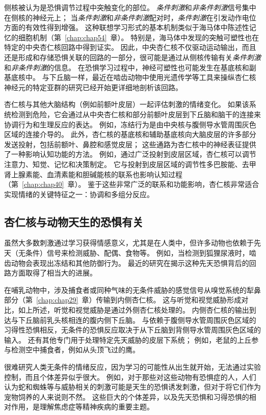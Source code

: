 侧核被认为是恐惧调节过程中突触变化的部位。
\textit{条件刺激}和\textit{非条件刺激}信号集中在侧核的神经元上；
当\textit{条件刺激}和\textit{非条件刺激}配对时，\textit{条件刺激}在引发动作电位方面的有效性得到增强。
这种联想学习形式的基本机制类似于海马体中陈述性记忆的细胞机制（第~\ref{chap:chap54}~章）。
特别是，海马体中发现的突触可塑性也在特定的中央杏仁核回路中得到证实。
因此，中央杏仁核不仅驱动运动输出，而且还是形成和存储恐惧关联的回路的一部分，很可能是通过从侧核传输有关\textit{条件刺激}和\textit{非条件刺激}的信息。
在恐惧学习过程中，神经可塑性也可能发生在基底核和副基底核中。
与下丘脑一样，最近在啮齿动物中使用光遗传学等工具来操纵杏仁核神经元的特定亚群的研究已经开始更详细地剖析该回路。


杏仁核与其他大脑结构（例如前额叶皮层）一起评估刺激的情绪变化。
如果该系统检测到危险，它会通过从中央杏仁核和部分前额叶皮层到下丘脑和脑干的连接来协调行为和生理反应的表达。
例如，冻结行为是由中央核与腹侧导水管周围灰色区域的连接介导的。
此外，杏仁核的基底核和辅助基底核向大脑皮层的许多部分发送投射，包括前额叶、鼻腔和感觉皮层；
这些通路为杏仁核中的神经表征提供了一种影响认知功能的方法。
例如，通过广泛投射到皮层区域，杏仁核可以调节注意力、知觉、记忆和决策制定。
它与投射到皮层区域的调节性多巴胺能、去甲肾上腺素能、血清素能和胆碱能核的联系也影响认知过程（第~\ref{chap:chap40}~章）。
鉴于这些非常广泛的联系和功能影响，杏仁核非常适合实现情绪的关键特征之一：协调和多组分反应。



\subsection{杏仁核与动物天生的恐惧有关}

虽然大多数刺激通过学习获得情感意义，尤其是在人类中，但许多动物也依赖于先天（无条件）信号来检测威胁、配偶、食物等。
例如，当检测到狐狸尿液时，啮齿动物会表现出冻结和其他防御行为。
最近的研究在揭示这种先天恐惧背后的回路方面取得了相当大的进展。


在哺乳动物中，涉及捕食者或同种气味的无条件威胁的感觉信号从嗅觉系统的犁鼻部分（第~\ref{chap:chap29}~章）传输到内侧杏仁核。
这与听觉和视觉威胁形成对比，如上所述，听觉和视觉威胁是通过外侧杏仁核处理的。
内侧杏仁核的输出到达与下丘脑前乳头核相连的腹内侧下丘脑。
与依赖于腹侧导水管周围灰色区域的习得性恐惧相反，无条件的恐惧反应取决于从下丘脑到背侧导水管周围灰色区域的输入。
还有其他专门用于处理特定先天威胁的皮层下系统；
例如，老鼠的上丘参与检测空中捕食者，例如从头顶飞过的鹰。


很难研究人类无条件的情绪反应，因为学习的可能性从出生就开始，无法通过实验控制，而且个体差异似乎很大。
例如，对于那些对这些动物有恐惧症的人，人们认为蛇和蜘蛛等与威胁相关的刺激可能是天生的恐惧诱发刺激，但对于将它们作为宠物饲养的人来说则不然。
这些巨大的个体差异，以及先天恐惧和习得恐惧的相对作用，是理解焦虑症等精神疾病的重要主题。



